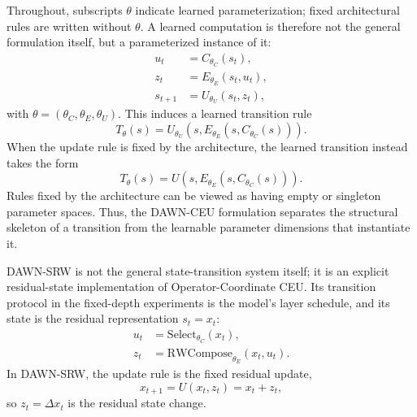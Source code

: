 \documentclass{article}
\begin{document}
Throughout, subscripts $\theta$ indicate learned parameterization; fixed architectural rules are written without $\theta$. A learned computation is therefore not the general formulation itself, but a parameterized instance of it:
\begin{align}
    u_t &= C_{\theta_C}(s_t), \label{eq:intro_learned_control}\\
    z_t &= E_{\theta_E}(s_t,u_t), \label{eq:intro_learned_exec}\\
    s_{t+1} &= U_{\theta_U}(s_t,z_t),
    \label{eq:intro_learned_transition}
\end{align}
with $\theta=(\theta_C,\theta_E,\theta_U)$. This induces a learned transition rule
\begin{equation}
    T_\theta(s)=U_{\theta_U}\!\left(s,E_{\theta_E}(s,C_{\theta_C}(s))\right).
    \label{eq:intro_learned_factorized_transition}
\end{equation}
When the update rule is fixed by the architecture, the learned transition instead takes the form
\begin{equation}
    T_\theta(s)=U\!\left(s,E_{\theta_E}(s,C_{\theta_C}(s))\right).
    \label{eq:intro_fixed_update_factorized_transition}
\end{equation}
Rules fixed by the architecture can be viewed as having empty or singleton parameter spaces. Thus, the DAWN-CEU formulation separates the structural skeleton of a transition from the learnable parameter dimensions that instantiate it.

DAWN-SRW is not the general state-transition system itself; it is an explicit residual-state implementation of Operator-Coordinate CEU. Its transition protocol in the fixed-depth experiments is the model's layer schedule, and its state is the residual representation $s_t=x_t$:
\begin{align}
    u_t &= \mathrm{Select}_{\theta_C}(x_t), \label{eq:intro_select}\\
    z_t &= \mathrm{RWCompose}_{\theta_E}(x_t,u_t). \label{eq:intro_rwcompose}
\end{align}
In DAWN-SRW, the update rule is the fixed residual update,
\begin{equation}
    x_{t+1}=U(x_t,z_t)=x_t+z_t,
    \label{eq:intro_srw_transition}
\end{equation}
so $z_t=\Delta x_t$ is the residual state change.
\end{document}
